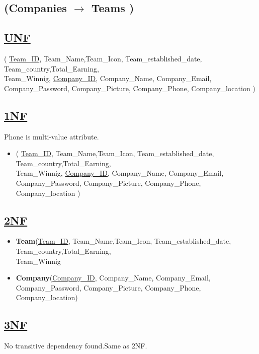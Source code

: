 \subsection{\texorpdfstring{\centering (Companies $\rightarrow$ Teams )}{ (Companies - Teams )}}

\subsection*{\underline{UNF}}

(
    \underline{Team\_ID}, Team\_Name,Team\_Icon, Team\_established\_date, Team\_country,Total\_Earning,\\Team\_Winnig,
    \underline{Company\_ID}, Company\_Name, Company\_Email, Company\_Password, Company\_Picture, Company\_Phone, Company\_location
)

\subsection*{\underline{1NF}}
Phone is multi-value attribute.

\begin{itemize}
    \item (
        \underline{Team\_ID}, Team\_Name,Team\_Icon, Team\_established\_date, Team\_country,Total\_Earning,\\Team\_Winnig,
        \underline{Company\_ID}, Company\_Name, Company\_Email, Company\_Password, Company\_Picture, Company\_Phone, Company\_location
    )
\end{itemize}

\subsection*{\underline{2NF}}
\begin{itemize}
    \item \textbf{Team}(\underline{Team\_ID}, Team\_Name,Team\_Icon, Team\_established\_date, Team\_country,Total\_Earning,\\Team\_Winnig
    \item \textbf{Company}(\underline{Company\_ID}, Company\_Name, Company\_Email, Company\_Password, Company\_Picture, Company\_Phone, Company\_location)
\end{itemize}

\subsection*{\underline{3NF}}
No transitive dependency found.Same as 2NF.

